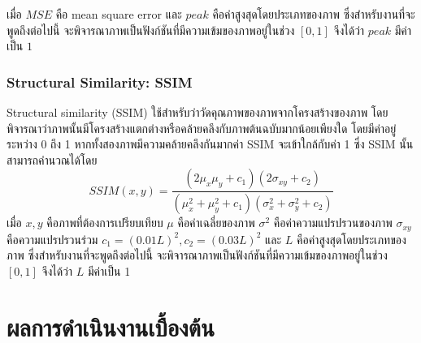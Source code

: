 \documentclass[hidelinks, a4paper,12pt]{article}
\numberwithin{equation}{section}							%
\numberwithin{equation}{section}
\begin{document}
{เมื่อ $MSE$ คือ mean square error และ $peak$ คือค่าสูงสุดโดยประเภทของภาพ ซึ่งสำหรับงานที่จะพูดถึงต่อไปนี้ จะพิจารณาภาพเป็นฟังก์ชันที่มีความเข้มของภาพอยู่ในช่วง $ [0,1] $ จึงได้ว่า $peak$ มีค่าเป็น $1$
\subsubsection{Structural Similarity: SSIM}
\hspace{1cm} Structural similarity (SSIM)  \cite{ref:SSIM} ใช้สำหรับว่าวัดคุณภาพของภาพจากโครงสร้างของภาพ โดยพิจารณาว่าภาพนั้นมีโครงสร้างแตกต่างหรือคล้ายคลึงกับภาพต้นฉบับมากน้อยเพียงใด โดยมีค่าอยู่ระหว่าง 0 ถึง 1 หากทั้งสองภาพมีความคล้ายคลึงกันมากค่า SSIM  จะเข้าใกล้กับค่า 1 ซึ่ง SSIM นั้นสามารถคำนวณได้โดย
$$ SSIM(x,y) = \frac{(2\mu_x\mu_y + c_1)(2\sigma_{xy} + c_2)}{(\mu_x^2+\mu_y^2+c_1)(\sigma_x^2+\sigma_y^2+c_2)}$$
เมื่อ $x,y$ คือภาพที่ต้องการเปรียบเทียบ $\mu$ คือค่าเฉลี่ยของภาพ $\sigma^2$ คือค่าความแปรปรวนของภาพ $\sigma_{xy}$ คือความแปรปรวนร่วม $c_1 =  (0.01L)^2, c_2 = (0.03L)^2$ และ $L$ คือค่าสูงสุดโดยประเภทของภาพ ซึ่งสำหรับงานที่จะพูดถึงต่อไปนี้ จะพิจารณาภาพเป็นฟังก์ชันที่มีความเข้มของภาพอยู่ในช่วง $ [0,1] $ จึงได้ว่า $L$ มีค่าเป็น 1


\section{ผลการดำเนินงานเบื้องต้น}
}
\end{document}
